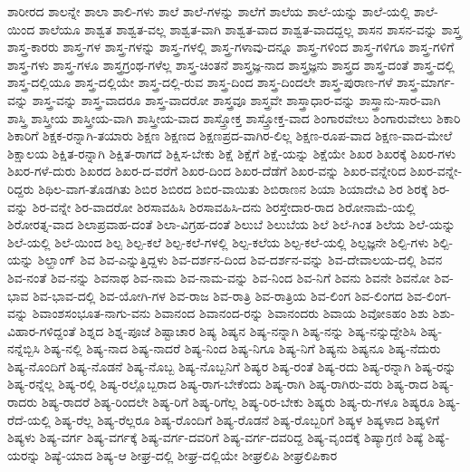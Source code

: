 {ಶಾರೀರದ
ಶಾಲನ್ನೇ
ಶಾಲಾ
ಶಾಲಿ-ಗಳು
ಶಾಲೆ
ಶಾಲೆ-ಗಳನ್ನು
ಶಾಲೆಗೆ
ಶಾಲೆಯ
ಶಾಲೆ-ಯನ್ನು
ಶಾಲೆ-ಯಲ್ಲಿ
ಶಾಲೆ-ಯಿಂದ
ಶಾಲೆಯೂ
ಶಾಶ್ವತ
ಶಾಶ್ವತ-ವಲ್ಲ
ಶಾಶ್ವತ-ವಾಗಿ
ಶಾಶ್ವತ-ವಾದ
ಶಾಶ್ವತ-ವಾದದ್ದಲ್ಲ
ಶಾಸನ
ಶಾಸನ-ವನ್ನು
ಶಾಸ್ತ್ರ
ಶಾಸ್ತ್ರ-ಕಾರರು
ಶಾಸ್ತ್ರ-ಗಳ
ಶಾಸ್ತ್ರ-ಗಳನ್ನು
ಶಾಸ್ತ್ರ-ಗಳಲ್ಲಿ
ಶಾಸ್ತ್ರ-ಗಳಾವು-ದನ್ನೂ
ಶಾಸ್ತ್ರ-ಗಳಿಂದ
ಶಾಸ್ತ್ರ-ಗಳಿಗೂ
ಶಾಸ್ತ್ರ-ಗಳಿಗೆ
ಶಾಸ್ತ್ರ-ಗಳು
ಶಾಸ್ತ್ರ-ಗಳೂ
ಶಾಸ್ತ್ರಗ್ರಂಥ-ಗಳೆಲ್ಲ
ಶಾಸ್ತ್ರ-ಚಿಂತನೆ
ಶಾಸ್ತ್ರಜ್ಞ-ನಾದ
ಶಾಸ್ತ್ರಜ್ಞನು
ಶಾಸ್ತ್ರದ
ಶಾಸ್ತ್ರ-ದಂತೆ
ಶಾಸ್ತ್ರ-ದಲ್ಲಿ
ಶಾಸ್ತ್ರ-ದಲ್ಲಿಯೂ
ಶಾಸ್ತ್ರ-ದಲ್ಲಿಯೇ
ಶಾಸ್ತ್ರ-ದಲ್ಲಿ-ರುವ
ಶಾಸ್ತ್ರ-ದಿಂದ
ಶಾಸ್ತ್ರ-ದಿಂದಲೇ
ಶಾಸ್ತ್ರ-ಪುರಾಣ-ಗಳೆ
ಶಾಸ್ತ್ರ-ಮಾರ್ಗ-ವನ್ನು
ಶಾಸ್ತ್ರ-ವನ್ನು
ಶಾಸ್ತ್ರ-ವಾದರೂ
ಶಾಸ್ತ್ರ-ವಾದರೋ
ಶಾಸ್ತ್ರವೂ
ಶಾಸ್ತ್ರವೇ
ಶಾಸ್ತ್ರಾಧಾರ-ವನ್ನು
ಶಾಸ್ತ್ರಾನು-ಸಾರ-ವಾಗಿ
ಶಾಸ್ತ್ರಿ
ಶಾಸ್ತ್ರೀಯ
ಶಾಸ್ತ್ರೀಯ-ವಾಗಿ
ಶಾಸ್ತ್ರೀಯ-ವಾದ
ಶಾಸ್ತ್ರೋಕ್ತ
ಶಾಸ್ತ್ರೋಕ್ತ-ವಾದ
ಶಿಂಗಾರವೇಲು
ಶಿಂಗಾರುವೇಲು
ಶಿಕಾರಿ
ಶಿಕಾರಿಗೆ
ಶಿಕ್ಷಕ-ರನ್ನಾಗಿ-ತಯಾರು
ಶಿಕ್ಷಣ
ಶಿಕ್ಷಣದ
ಶಿಕ್ಷಣಪ್ರದ-ವಾಗಿರ-ಲಿಲ್ಲ
ಶಿಕ್ಷಣ-ರೂಪ-ವಾದ
ಶಿಕ್ಷಣ-ವಾದ-ಮೇಲೆ
ಶಿಕ್ಷಾಲಯ
ಶಿಕ್ಷಿತ-ರನ್ನಾಗಿ
ಶಿಕ್ಷಿತ-ರಾಗದೆ
ಶಿಕ್ಷಿಸ-ಬೇಕು
ಶಿಕ್ಷೆ
ಶಿಕ್ಷೆಗೆ
ಶಿಕ್ಷೆ-ಯನ್ನು
ಶಿಕ್ಷೆಯೇ
ಶಿಖರ
ಶಿಖರಕ್ಕೆ
ಶಿಖರ-ಗಳು
ಶಿಖರ-ಗಳೆ-ದುರು
ಶಿಖರದ
ಶಿಖರ-ದ-ವರೆಗೆ
ಶಿಖರ-ದಿಂದ
ಶಿಖರ-ದೆಡೆಗೆ
ಶಿಖರ-ವನ್ನು
ಶಿಖರ-ವನ್ನೇರಿದ
ಶಿಖರ-ವನ್ನೇ-ರಿದ್ದರು
ಶಿಥಿಲ-ವಾಗ-ತೊಡಗಿತು
ಶಿಬಿರ
ಶಿಬಿರದ
ಶಿಬಿರ-ವಾಯಿತು
ಶಿಬಿರಾಣನ
ಶಿಯಾ
ಶಿಯಾದೇವಿ
ಶಿರ
ಶಿರಕ್ಕೆ
ಶಿರ-ವನ್ನು
ಶಿರ-ವನ್ನೇ
ಶಿರ-ವಾದರೋ
ಶಿರಸಾವಹಿಸಿ
ಶಿರಸಾವಹಿಸಿ-ದನು
ಶಿರಸ್ತೇದಾರ-ರಾದ
ಶಿರೋನಾಮೆ-ಯಲ್ಲಿ
ಶಿರೋರತ್ನ-ವಾದ
ಶಿಲಾಪ್ರವಾಹ-ದಂತೆ
ಶಿಲಾ-ವಿಗ್ರಹ-ದಂತೆ
ಶಿಲುಬೆ
ಶಿಲುಬೆಯ
ಶಿಲೆ
ಶಿಲೆ-ಗಿಂತ
ಶಿಲೆಯ
ಶಿಲೆ-ಯನ್ನು
ಶಿಲೆ-ಯಲ್ಲಿ
ಶಿಲೆ-ಯಿಂದ
ಶಿಲ್ಪ
ಶಿಲ್ಪ-ಕಲೆ
ಶಿಲ್ಪ-ಕಲೆ-ಗಳಲ್ಲಿ
ಶಿಲ್ಪ-ಕಲೆಯ
ಶಿಲ್ಪ-ಕಲೆ-ಯಲ್ಲಿ
ಶಿಲ್ಪಜ್ಞನೇ
ಶಿಲ್ಪಿ-ಗಳು
ಶಿಲ್ಪಿ-ಯನ್ನು
ಶಿಲ್ಹಾಂಗ್
ಶಿವ
ಶಿವ-ಎನ್ನುತ್ತಿದ್ದಳು
ಶಿವ-ದರ್ಶನ-ದಿಂದ
ಶಿವ-ದರ್ಶನ-ವನ್ನು
ಶಿವ-ದೇವಾಲಯ-ದಲ್ಲಿ
ಶಿವನ
ಶಿವ-ನಂತೆ
ಶಿವ-ನನ್ನು
ಶಿವನಾಥ
ಶಿವ-ನಾಮ
ಶಿವ-ನಾಮ-ವನ್ನು
ಶಿವ-ನಿಂದ
ಶಿವ-ನಿಗೆ
ಶಿವನು
ಶಿವನೇ
ಶಿವನೋ
ಶಿವ-ಭಾವ
ಶಿವ-ಭಾವ-ದಲ್ಲಿ
ಶಿವ-ಯೋಗಿ-ಗಳ
ಶಿವ-ರಾಜ
ಶಿವ-ರಾತ್ರಿ
ಶಿವ-ರಾತ್ರಿಯ
ಶಿವ-ಲಿಂಗ
ಶಿವ-ಲಿಂಗದ
ಶಿವ-ಲಿಂಗ-ವನ್ನು
ಶಿವಾಂಶಸಂಭೂತ-ನಾಗು-ವನು
ಶಿವಾನಂದ
ಶಿವಾನಂದ-ರನ್ನು
ಶಿವಾನಂದರು
ಶಿವಾಯ
ಶಿವೋಽಹಂ
ಶಿಶು
ಶಿಶು-ವಿಹಾರ-ಗಳಿದ್ದಂತೆ
ಶಿಶ್ನದ
ಶಿಶ್ನ-ಪೂಜೆ
ಶಿಷ್ಟಾಚಾರ
ಶಿಷ್ಯ
ಶಿಷ್ಯನ
ಶಿಷ್ಯ-ನನ್ನಾಗಿ
ಶಿಷ್ಯ-ನನ್ನು
ಶಿಷ್ಯ-ನನ್ನುದ್ದೇಶಿಸಿ
ಶಿಷ್ಯ-ನನ್ನೆಬ್ಬಿಸಿ
ಶಿಷ್ಯ-ನಲ್ಲಿ
ಶಿಷ್ಯ-ನಾದ
ಶಿಷ್ಯ-ನಾದರೆ
ಶಿಷ್ಯ-ನಿಂದ
ಶಿಷ್ಯ-ನಿಗೂ
ಶಿಷ್ಯ-ನಿಗೆ
ಶಿಷ್ಯನು
ಶಿಷ್ಯನೂ
ಶಿಷ್ಯ-ನೆದುರು
ಶಿಷ್ಯ-ನೊಂದಿಗೆ
ಶಿಷ್ಯ-ನೊಡನೆ
ಶಿಷ್ಯ-ನೊಬ್ಬ
ಶಿಷ್ಯ-ನೊಬ್ಬನಿಗೆ
ಶಿಷ್ಯರ
ಶಿಷ್ಯ-ರಂತೆ
ಶಿಷ್ಯ-ರದು
ಶಿಷ್ಯ-ರನ್ನಾಗಿ
ಶಿಷ್ಯ-ರನ್ನು
ಶಿಷ್ಯ-ರನ್ನೆಲ್ಲ
ಶಿಷ್ಯ-ರಲ್ಲಿ
ಶಿಷ್ಯ-ರಲ್ಲೊಬ್ಬರಾದ
ಶಿಷ್ಯ-ರಾಗ-ಬೇಕೆಂದು
ಶಿಷ್ಯ-ರಾಗಿ
ಶಿಷ್ಯ-ರಾಗಿರು-ವರು
ಶಿಷ್ಯ-ರಾದ
ಶಿಷ್ಯ-ರಾದರು
ಶಿಷ್ಯ-ರಾದರೆ
ಶಿಷ್ಯ-ರಿಂದಲೇ
ಶಿಷ್ಯ-ರಿಗೆ
ಶಿಷ್ಯ-ರಿಗೆಲ್ಲ
ಶಿಷ್ಯ-ರಿರ-ಬೇಕು
ಶಿಷ್ಯರು
ಶಿಷ್ಯ-ರು-ಗಳೂ
ಶಿಷ್ಯರೂ
ಶಿಷ್ಯ-ರೆದೆ-ಯಲ್ಲಿ
ಶಿಷ್ಯ-ರೆಲ್ಲ
ಶಿಷ್ಯ-ರೆಲ್ಲರೂ
ಶಿಷ್ಯ-ರೊಂದಿಗೆ
ಶಿಷ್ಯ-ರೊಡನೆ
ಶಿಷ್ಯ-ರೊಬ್ಬರಿಗೆ
ಶಿಷ್ಯಳ
ಶಿಷ್ಯಳಾದ
ಶಿಷ್ಯಳಿಗೆ
ಶಿಷ್ಯಳು
ಶಿಷ್ಯ-ವರ್ಗ
ಶಿಷ್ಯ-ವರ್ಗಕ್ಕೆ
ಶಿಷ್ಯ-ವರ್ಗ-ದವರಿಗೆ
ಶಿಷ್ಯ-ವರ್ಗ-ದವರಿದ್ದ
ಶಿಷ್ಯ-ವೃಂದಕ್ಕೆ
ಶಿಷ್ಯಾಗ್ರಣಿ
ಶಿಷ್ಯೆ
ಶಿಷ್ಯೆ-ಯರನ್ನು
ಶಿಷ್ಯೆ-ಯಾದ
ಶಿಷ್ಯ-ಆ
ಶೀಘ್ರ-ದಲ್ಲಿ
ಶೀಘ್ರ-ದಲ್ಲಿಯೇ
ಶೀಘ್ರಲಿಪಿ
ಶೀಘ್ರಲಿಪಿಕಾರ
}
